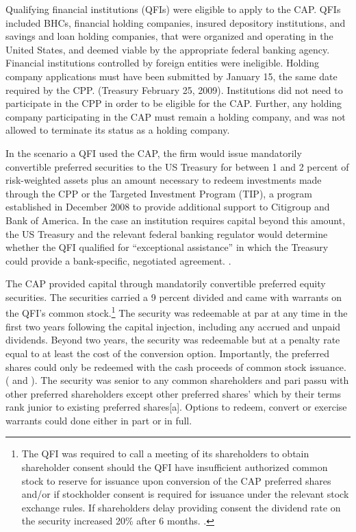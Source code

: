 \documentclass[12pt]{article}
\begin{document}
Qualifying financial institutions (QFIs) were eligible to apply to the CAP. QFIs included BHCs, financial holding companies, insured depository institutions, and savings and loan holding companies, that were organized and operating in the United States, and deemed viable by the appropriate federal banking agency. Financial institutions controlled by foreign entities were ineligible. Holding company applications must have been submitted by January 15, the same date required by the CPP. (Treasury February 25, 2009). Institutions did not need to participate in the CPP in order to be eligible for the CAP. Further, any holding company participating in the CAP must remain a holding company, and was not allowed to terminate its status as a holding company.


In the scenario a QFI used the CAP, the firm would issue mandatorily convertible preferred securities to the US Treasury for between 1 and 2 percent of risk-weighted assets plus an amount necessary to redeem investments made through the CPP or the Targeted Investment Program (TIP), a program established in December 2008 to provide additional support to Citigroup and Bank of America. In the case an institution requires capital beyond this amount, the US Treasury and the relevant federal banking regulator would determine whether the QFI qualified for “exceptional assistance'' in which the Treasury could provide a bank-specific, negotiated agreement. \citep{WhitePaper}.


The CAP provided capital through mandatorily convertible preferred equity securities. The securities carried a 9 percent divided and came with warrants on the QFI's common stock.\footnote{The QFI was required to call a meeting of its shareholders to obtain shareholder consent should the QFI have insufficient authorized common stock to reserve for issuance upon conversion of the CAP preferred shares and/or if stockholder consent is required for issuance under the relevant stock exchange rules. If shareholders delay providing consent the dividend rate on the security increased 20\% after 6 months. \citep{CAPTerms}.} The security was redeemable at par at any time in the first two years following the capital injection, including any accrued and unpaid dividends. Beyond two years, the security was redeemable but at a penalty rate equal to at least the cost of the conversion option. Importantly, the preferred shares could only be redeemed with the cash proceeds of common stock issuance.  (\citet{WhitePaper} and \citet{GW}). The security was senior to any common shareholders and pari passu with other preferred shareholders except other preferred shares' which by their terms rank junior to existing preferred shares[a]. Options to redeem, convert or exercise warrants could done either in part or in full.
\end{document}
